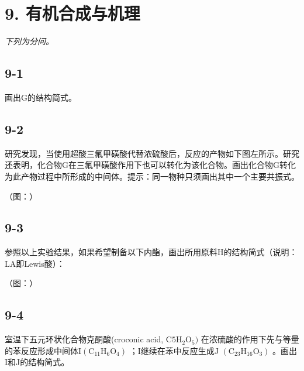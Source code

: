 \section*{9. 有机合成与机理}
\textit{下列为分问。}

\subsection*{9-1}
画出G的结构简式。

\subsection*{9-2}
研究发现，当使⽤超酸三氟甲磺酸代替浓硫酸后，反应的产物如下图左所⽰。研究还表明，化合物G在三氟甲磺酸作⽤下也可以转化为该化合物。画出化合物G转化为此产物过程中所形成的中间体。提⽰：同⼀物种只须画出其中⼀个主要共振式。

（图：）

\subsection*{9-3}
参照以上实验结果，如果希望制备以下内酯，画出所⽤原料H的结构简式（说明：LA即Lewis酸）：

（图：）

\subsection*{9-4}
室温下五元环状化合物克酮酸(croconic acid, $\mathrm { C 5 H _ { 2 } O _ { 5 } ) }$ 在浓硫酸的作⽤下先与等量的苯反应形成中间体I$\mathrm { ( C _ { 1 1 } H _ { 6 } O _ { 4 } ) }$ ；I继续在苯中反应⽣成J $\left( \mathrm { C } _ { 2 3 } \mathrm { H } _ { 1 6 } \mathrm { O } _ { 3 } \right)$ 。画出I和J的结构简式。
